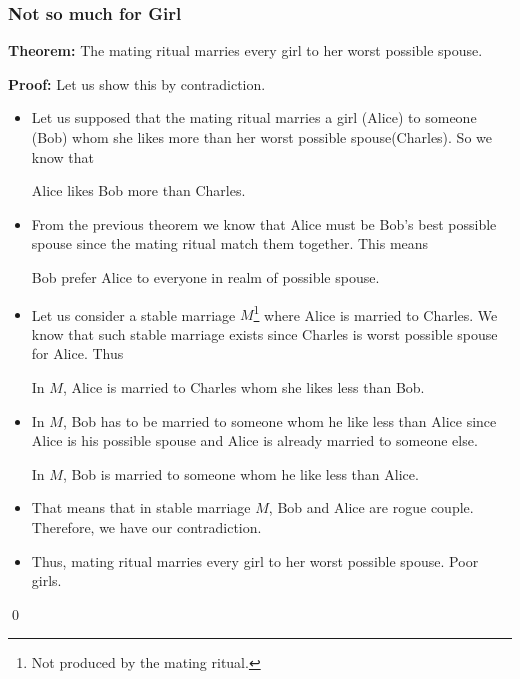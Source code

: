 \documentclass[a4paper, 12pt]{article}
\newcommand{\theorem}{\vspace{1em}\noindent\textbf{Theorem:} }
\renewcommand{\proof}{\vspace{0.5em}\noindent\textbf{Proof:} }
\newcommand{\qedd}{\qed\newline}
\begin{document}
	\subsubsection*{Not so much for Girl}
	
	\theorem The mating ritual marries every girl to her worst possible spouse.
	
	\proof Let us show this by contradiction. 
	\begin{itemize}
	\item Let us supposed that the mating ritual marries a girl (Alice) to someone (Bob) whom she likes more than her worst possible spouse(Charles). So we know that
	\begin{center}
		Alice likes Bob more than Charles.
	\end{center}
	
	\item From the previous theorem we know that Alice must be Bob's best possible spouse since the mating ritual match them together. This means
	\begin{center}
		Bob prefer Alice to everyone in realm of possible spouse.
	\end{center}
	
	\item Let us consider a stable marriage $M$\footnote{Not produced by the mating ritual.} where Alice is married to Charles. We know that such stable marriage exists since Charles is worst possible spouse for Alice. Thus
	\begin{center}
		In $M$, Alice is married to Charles whom she likes less than Bob.
	\end{center}
	
	\item In $M$, Bob has to be married to someone whom he like less than Alice since Alice is his possible spouse and Alice is already married to someone else.
	\begin{center}
		In $M$, Bob is married to someone whom he like less than Alice.
	\end{center}
	
	\item That means that in stable marriage $M$, Bob and Alice are rogue couple. Therefore, we have our contradiction.
	
	\item Thus, mating ritual marries every girl to her worst possible spouse. Poor girls. 
	
	\end{itemize}
	
	\qedd
	
	
	
	
	
	
	
	
	


	
	
\end{document}
